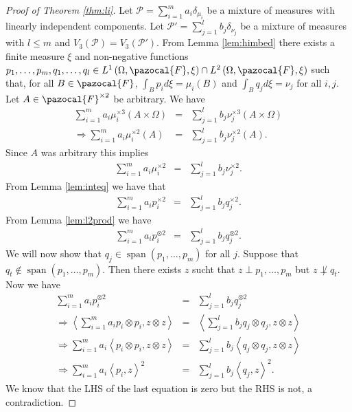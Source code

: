 \documentclass[aos]{imsart}
\def\l{\left}
\def\r{\right}
\def\sF{\pazocal{F}}
\def\sP{\mathscr{P}}
\def\span{\operatorname{span}}
\def\span{\operatorname{span}}
\theoremstyle{plain}
\theoremstyle{defintion}
\begin{document}
	\begin{proof}[Proof of Theorem \ref{thm:li}]
		Let $\sP = \sum_{i=1}^m a_i \delta_{\mu_i}$ be a mixture of measures with linearly independent components. Let $\sP' = \sum_{j=1}^l  b_j \delta_{\nu_j}$ be a mixture of measures with $l\le m$ and $V_3(\sP) = V_3(\sP')$. From Lemma \ref{lem:himbed} there exists a finite measure $\xi$ and non-negative functions $p_1,\ldots,p_m,q_1,\ldots,q_l \in L^1\left( \Omega, \sF, \xi \right)\cap L^2\left( \Omega, \sF, \xi \right)$ such that, for all $B\in \sF$, $\int_B p_i d\xi = \mu_i(B)$ and $\int_B q_j d\xi = \nu_j$ for all $i,j$.
		Let $A\in \sF^{\times 2}$ be arbitrary. We have 
		\begin{eqnarray*}
			\sum_{i=1}^m a_i \mu_i^{\times 3}\left( A\times \Omega \right)   &=& \sum_{j=1}^l b_j \nu_j^{\times 3}\left( A\times \Omega \right)\\
			\Rightarrow \sum_{i=1}^m a_i \mu_i^{\times 2}\left( A \right)   &=& \sum_{j=1}^l b_j \nu_j^{\times 2}\left( A \right).
		\end{eqnarray*}
		Since $A$ was arbitrary this implies
		\begin{eqnarray*}
			\sum_{i=1}^m a_i \mu_i^{\times 2} &=& \sum_{j=1}^l b_j \nu_j^{\times 2}.
		\end{eqnarray*}
		From Lemma \ref{lem:inteq}  we have that
		\begin{eqnarray*}
			\sum_{i=1}^m a_i p_i^{\times 2}   &=& \sum_{j=1}^l b_j q_j^{\times 2}.
		\end{eqnarray*}
		From Lemma \ref{lem:l2prod} we have
		\begin{eqnarray*}
			\sum_{i=1}^m a_i p_i^{\otimes 2}   &=& \sum_{j=1}^l b_j q_j^{\otimes 2}.
		\end{eqnarray*}
		We will now show that $q_j\in \span\left( p_1,\ldots,p_m \right)$ for all $j$. Suppose that $q_t \notin \span\left( p_1,\ldots,p_m \right)$. Then there exists $z$ sucht that $z\perp p_1,\ldots ,p_m$ but $z \not \perp q_t$. Now we have 
		\begin{eqnarray*}
			\sum_{i=1}^m a_i p_i^{\otimes 2}   &=& \sum_{j=1}^l b_j q_j^{\otimes 2}\\
			\Rightarrow \l<\sum_{i=1}^m a_i p_i\otimes p_i, z\otimes z\r>   &=& \l<\sum_{j=1}^l b_j q_j \otimes q_j,z\otimes z\r> \\
			\Rightarrow \sum_{i=1}^m a_i \l< p_i \otimes p_i, z\otimes z\r>   &=& \sum_{j=1}^l b_j \l<  q_j\otimes q_j,z\otimes z\r> \\
			\Rightarrow \sum_{i=1}^m a_i \l< p_i , z\r>^2   &=& \sum_{j=1}^l b_j \l<  q_j,z\r>^2.
		\end{eqnarray*}
		We know that the LHS of the last equation is zero but the RHS is not, a contradiction.


\end{proof}
\end{document}
